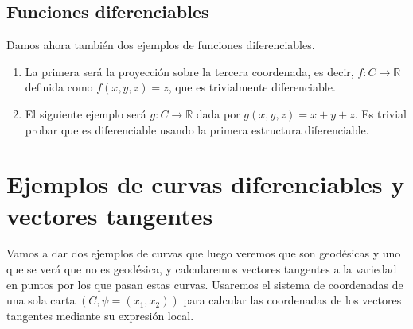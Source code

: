 \documentclass[twoside, 11pt]{article}
\theoremstyle{definition}
\newcommand{\R}{\mathbb{R}}
\begin{document}
\subsection{Funciones diferenciables}

Damos ahora también dos ejemplos de funciones diferenciables. 

\begin{enumerate}


\item
 La primera será la proyección sobre la tercera coordenada, es decir, $f:C\to\R$ definida como $f(x,y,z)=z$, que es trivialmente diferenciable. 

\item
 El siguiente ejemplo será $g:C\to\R$ dada por $g(x,y,z)=x+y+z$. Es trivial probar que es diferenciable usando la primera estructura diferenciable. 

\end{enumerate}


\section{Ejemplos de curvas diferenciables y vectores tangentes}



Vamos a dar dos ejemplos de curvas que luego veremos que son geodésicas y uno que se verá que no es geodésica, y calcularemos vectores tangentes a la variedad en puntos por los que pasan estas curvas. Usaremos el sistema de coordenadas de una sola carta $(C, \psi=(x_1,x_2))$ para calcular las coordenadas de los vectores tangentes mediante su expresión local.

%
%
%
\end{document}
